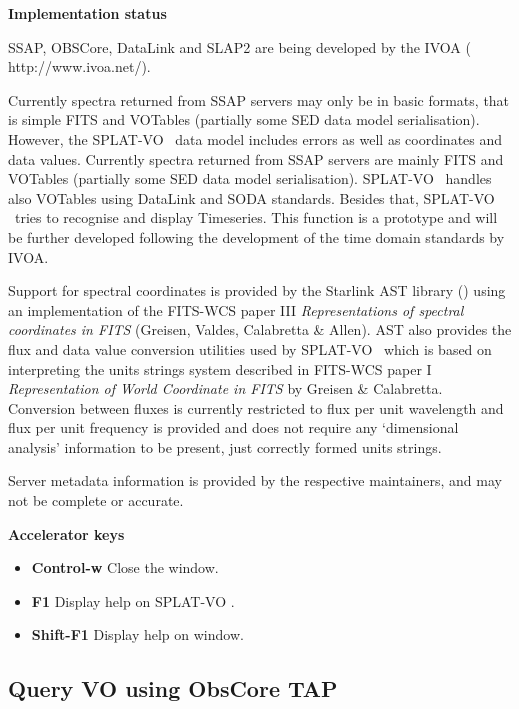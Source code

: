 \documentclass[twoside,11pt,nolof]{starlink}
\providecommand{\SPLAT}{\textsf{SPLAT-VO }}
\newcommand{\labelitem}[1]{\textbf{#1}}
\providecommand{\subheading}[1]{\textbf{\large{#1}}}
\begin{document}
\subheading{Implementation status}

SSAP, OBSCore, DataLink and  SLAP2  are  being developed by the IVOA
(
{http://www.ivoa.net/}).

Currently spectra returned from SSAP servers may only be in basic formats,
that is simple FITS and VOTables (partially some SED data model serialisation).
However, the \SPLAT\ data model includes errors as well as coordinates and
data values.
Currently spectra returned from SSAP servers are mainly FITS and VOTables (partially some SED data model serialisation).  \SPLAT\ handles also VOTables using DataLink and SODA standards.  Besides that, \SPLAT\ tries to recognise and display Timeseries. This function is a prototype and will be further developed following the development of the time domain standards by IVOA.

Support for spectral coordinates is provided by the Starlink AST library
() using an implementation of the FITS-WCS paper III
\textit{Representations of spectral coordinates in FITS}
(Greisen,
Valdes, Calabretta \& Allen).
AST also provides the flux and data value conversion utilities used by
\SPLAT\ which is based on interpreting the units strings system described
in FITS-WCS paper I \textit{Representation of World Coordinate in FITS}
by Greisen \& Calabretta.
Conversion between fluxes is currently restricted to flux per unit wavelength
and flux per unit frequency is provided and does not require any `dimensional
analysis' information to be present, just correctly formed units strings.

Server metadata information is provided by the respective maintainers, and may
not be complete or accurate.

\subheading{Accelerator keys}

\begin{itemize}
\item \labelitem{Control-w} Close the window.
\item \labelitem{F1} Display help on \SPLAT.
\item \labelitem{Shift-F1} Display help on window.
\end{itemize}


\newpage
\subsection{Query VO using ObsCore TAP}
\end{document}
